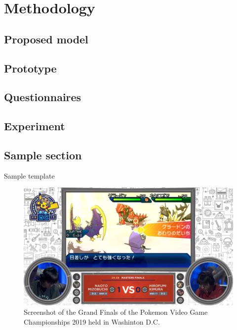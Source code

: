 \chapter{Methodology}\label{ch:4}

\section{Proposed model}

\section{Prototype}

\section{Questionnaires}

\section{Experiment}

\section{Sample section}

Sample template \cite{alphago}

\begin{figure}
  \centering
  \includegraphics[width=\columnwidth]{resources/1_intro/vgc2019.png}
    \caption{Screenshot of the Grand Finals of the Pokemon Video Game Championships 2019 held in Washinton D.C.}
\end{figure}